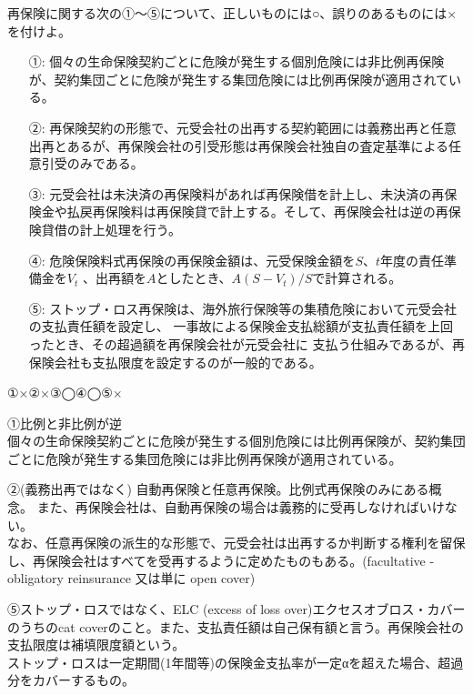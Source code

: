 \documentclass[report,gutter=10mm,fore-edge=10mm,uplatex,dvipdfmx]{jlreq}
\begin{document}
再保険に関する次の①～⑤について、正しいものには○、誤りのあるものには×を付けよ。

\begin{itemize}
\item[ ①: ] 個々の生命保険契約ごとに危険が発生する個別危険には非比例再保険が、契約集団ごとに危険が発生する集団危険には比例再保険が適用されている。
\item[ ②: ] 再保険契約の形態で、元受会社の出再する契約範囲には義務出再と任意出再とあるが、再保険会社の引受形態は再保険会社独自の査定基準による任意引受のみである。
\item[ ③: ] 元受会社は未決済の再保険料があれば再保険借を計上し、未決済の再保険金や払戻再保険料は再保険貸で計上する。そして、再保険会社は逆の再保険貸借の計上処理を行う。
\item[ ④: ] 危険保険料式再保険の再保険金額は、元受保険金額を$S$、$t$年度の責任準備金を$V_t$ 、出再額を$A$としたとき、$A(S-V_t)/S$で計算される。
\item[ ⑤: ] ストップ・ロス再保険は、海外旅行保険等の集積危険において元受会社の支払責任額を設定し、
 一事故による保険金支払総額が支払責任額を上回ったとき、その超過額を再保険会社が元受会社に
 支払う仕組みであるが、再保険会社も支払限度を設定するのが一般的である。
\end{itemize}
\answer{}
①×②×③◯④◯⑤×

①比例と非比例が逆\\
個々の生命保険契約ごとに危険が発生する個別危険には比例再保険が、契約集団ごとに危険が発生する集団危険には非比例再保険が適用されている。

②(義務出再ではなく) 自動再保険と任意再保険。比例式再保険のみにある概念。
また、再保険会社は、自動再保険の場合は義務的に受再しなければいけない。\\
なお、任意再保険の派生的な形態で、元受会社は出再するか判断する権利を留保し、再保険会社はすべてを受再するように定めたものもある。(facultative - obligatory reinsurance 又は単に open cover)

⑤ストップ・ロスではなく、ELC (excess of loss over)エクセスオブロス・カバーのうちのcat coverのこと。また、支払責任額は自己保有額と言う。再保険会社の支払限度は補填限度額という。\\
ストップ・ロスは一定期間(1年間等)の保険金支払率が一定αを超えた場合、超過分をカバーするもの。

\end{document}
